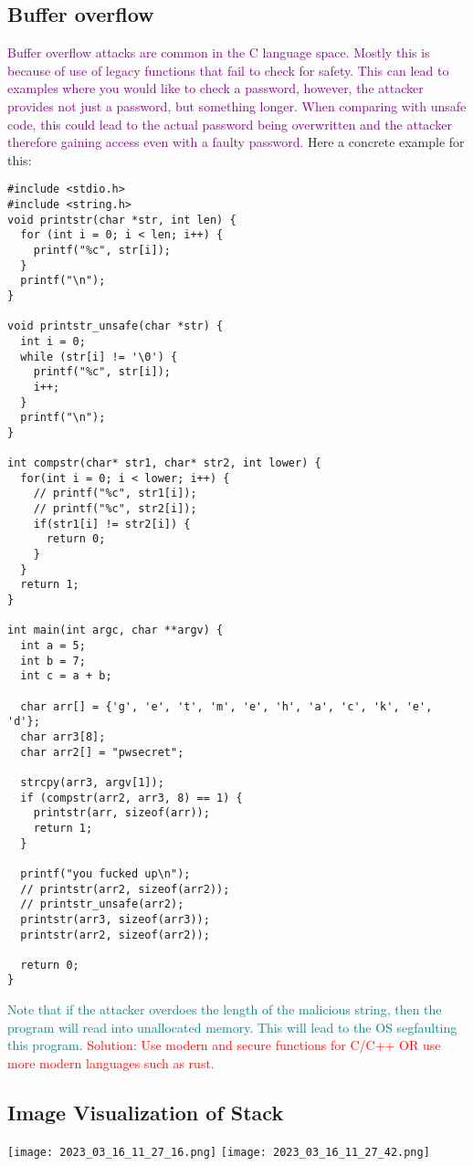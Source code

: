 \documentclass[main.tex,fontsize=8pt,paper=a4,paper=portrait,DIV=calc,]{scrartcl}
\begin{document}
\subsection{Buffer overflow}
\textcolor{purple}{Buffer overflow attacks are common in the C language space. Mostly this is because of use of legacy functions that fail to check for safety.\newline
This can lead to examples where you would like to check a password, however, the attacker provides not just a password, but something longer. When comparing with unsafe code, this could lead to the actual password being overwritten and the attacker therefore gaining access even with a faulty password.}\newline
Here a concrete example for this:
\begin{lstlisting}
#include <stdio.h>
#include <string.h>
void printstr(char *str, int len) {
  for (int i = 0; i < len; i++) {
    printf("%c", str[i]);
  }
  printf("\n");
}

void printstr_unsafe(char *str) {
  int i = 0;
  while (str[i] != '\0') {
    printf("%c", str[i]);
    i++;
  }
  printf("\n");
}

int compstr(char* str1, char* str2, int lower) {
  for(int i = 0; i < lower; i++) {
    // printf("%c", str1[i]);
    // printf("%c", str2[i]);
    if(str1[i] != str2[i]) {
      return 0;
    }
  }
  return 1;
}

int main(int argc, char **argv) {
  int a = 5;
  int b = 7;
  int c = a + b;

  char arr[] = {'g', 'e', 't', 'm', 'e', 'h', 'a', 'c', 'k', 'e', 'd'};
  char arr3[8];
  char arr2[] = "pwsecret";
  
  strcpy(arr3, argv[1]);
  if (compstr(arr2, arr3, 8) == 1) {
    printstr(arr, sizeof(arr));
    return 1;
  }

  printf("you fucked up\n");
  // printstr(arr2, sizeof(arr2));
  // printstr_unsafe(arr2);
  printstr(arr3, sizeof(arr3));   
  printstr(arr2, sizeof(arr2));   

  return 0;
}
\end{lstlisting}
\textcolor{teal}{Note that if the attacker overdoes the length of the malicious string, then the program will read into unallocated memory. This will lead to the OS segfaulting this program.}\newline
\textcolor{red}{Solution: Use modern and secure functions for C/C++ OR use more modern languages such as rust.}

\subsection{Image Visualization of Stack}
\texttt{[image: 2023\_03\_16\_11\_27\_16.png]}
\texttt{[image: 2023\_03\_16\_11\_27\_42.png]}
\end{document}
